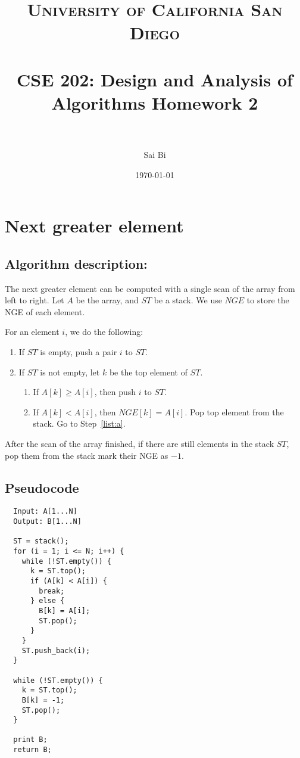 \documentclass[paper=a4, fontsize=11pt]{scrartcl} %
\title{	
\normalfont \normalsize 
\textsc{University of California San Diego} \\ [25pt] %
\horrule{0.5pt} \\[0.4cm] %
\huge CSE 202: Design and Analysis of Algorithms Homework 2 \\ %
\horrule{2pt} \\[0.5cm] %
}
\author{Sai Bi} %
\date{\normalsize\today} %
\numberwithin{equation}{section} %
\numberwithin{figure}{section} %
\numberwithin{table}{section} %
\numberwithin{claimcounter}{section}
\begin{document}
\maketitle %

\section{Next greater element}

\subsection*{Algorithm description:}
The next greater element can be computed with a single scan of the array from
left to right. Let $A$ be the array, and $ST$ be a stack. We use $NGE$ to store
the NGE of each element.

For an element $i$, we do the following:
\begin{enumerate}
  \item \label{list:a} If $ST$ is empty, push a pair $i$ to $ST$.
  \item If $ST$ is not empty, let $k$ be the top element of $ST$.
    \begin{enumerate}
      \item If $A[k] \geq A[i]$, then push $i$ to $ST$.
      \item If $A[k] < A[i]$, then $NGE[k] = A[i]$. Pop top element from the
        stack. Go to Step~\ref{list:a}.
    \end{enumerate}
\end{enumerate}
After the scan of the array finished, if there are still elements in the stack
$ST$, pop them from the stack mark their NGE as $-1$.

\subsection*{Pseudocode}
\begin{verbatim}
  Input: A[1...N]
  Output: B[1...N]

  ST = stack();
  for (i = 1; i <= N; i++) {
    while (!ST.empty()) {
      k = ST.top();
      if (A[k] < A[i]) {
        break;
      } else {
        B[k] = A[i];
        ST.pop();
      }
    }
    ST.push_back(i);
  } 

  while (!ST.empty()) {
    k = ST.top();
    B[k] = -1; 
    ST.pop();
  }

  print B;
  return B;
\end{verbatim}
\end{document}
